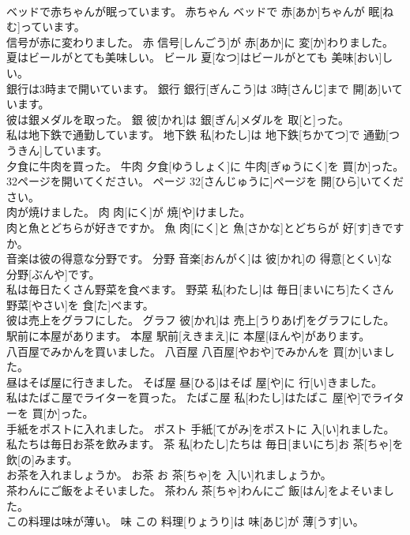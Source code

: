 \documentclass[8pt]{extreport}
\begin{document}
\begin{CJK}{UTF8}{min}
\\	ベッドで赤ちゃんが眠っています。	赤ちゃん	ベッドで 赤[あか]ちゃんが 眠[ねむ]っています。	
\\	信号が赤に変わりました。	赤	信号[しんごう]が 赤[あか]に 変[か]わりました。	
\\	夏はビールがとても美味しい。	ビール	夏[なつ]はビールがとても 美味[おい]しい。	
\\	銀行は3時まで開いています。	銀行	銀行[ぎんこう]は 3時[さんじ]まで 開[あ]いています。	
\\	彼は銀メダルを取った。	銀	彼[かれ]は 銀[ぎん]メダルを 取[と]った。	
\\	私は地下鉄で通勤しています。	地下鉄	私[わたし]は 地下鉄[ちかてつ]で 通勤[つうきん]しています。	
\\	夕食に牛肉を買った。	牛肉	夕食[ゆうしょく]に 牛肉[ぎゅうにく]を 買[か]った。	
\\	32ページを開いてください。	ページ	32[さんじゅうに]ページを 開[ひら]いてください。	
\\	肉が焼けました。	肉	肉[にく]が 焼[や]けました。	
\\	肉と魚とどちらが好きですか。	魚	肉[にく]と 魚[さかな]とどちらが 好[す]きですか。	
\\	音楽は彼の得意な分野です。	分野	音楽[おんがく]は 彼[かれ]の 得意[とくい]な 分野[ぶんや]です。	
\\	私は毎日たくさん野菜を食べます。	野菜	私[わたし]は 毎日[まいにち]たくさん 野菜[やさい]を 食[た]べます。	
\\	彼は売上をグラフにした。	グラフ	彼[かれ]は 売上[うりあげ]をグラフにした。	
\\	駅前に本屋があります。	本屋	駅前[えきまえ]に 本屋[ほんや]があります。	
\\	八百屋でみかんを買いました。	八百屋	八百屋[やおや]でみかんを 買[か]いました。	
\\	昼はそば屋に行きました。	そば屋	昼[ひる]はそば 屋[や]に 行[い]きました。	
\\	私はたばこ屋でライターを買った。	たばこ屋	私[わたし]はたばこ 屋[や]でライターを 買[か]った。	
\\	手紙をポストに入れました。	ポスト	手紙[てがみ]をポストに 入[い]れました。	
\\	私たちは毎日お茶を飲みます。	茶	私[わたし]たちは 毎日[まいにち]お 茶[ちゃ]を 飲[の]みます。	
\\	お茶を入れましょうか。	お茶	お 茶[ちゃ]を 入[い]れましょうか。	
\\	茶わんにご飯をよそいました。	茶わん	茶[ちゃ]わんにご 飯[はん]をよそいました。	
\\	この料理は味が薄い。	味	この 料理[りょうり]は 味[あじ]が 薄[うす]い。	

\end{CJK}
\end{document}
